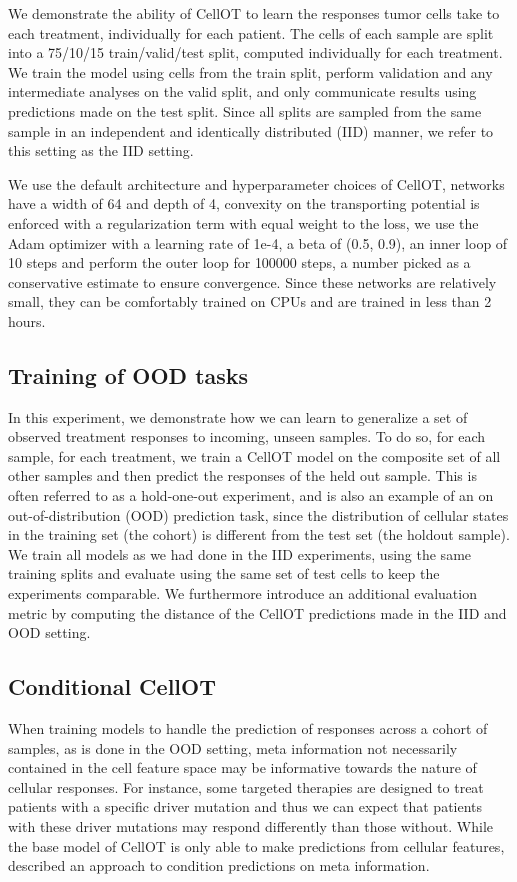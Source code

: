 We demonstrate the ability of CellOT to learn the responses tumor cells take to each treatment, individually for each patient. The cells of each sample are split into a 75/10/15 train/valid/test split, computed individually for each treatment. We train the model using cells from the train split, perform validation and any intermediate analyses on the valid split, and only communicate results using predictions made on the test split. Since all splits are sampled from the same sample in an independent and identically distributed (IID) manner, we refer to this setting as the IID setting.

We use the default architecture and hyperparameter choices of CellOT, networks have a width of 64 and depth of 4, convexity on the transporting potential is enforced with a regularization term with equal weight to the loss, we use the Adam optimizer \cite{kingma2014} with a learning rate of 1e-4, a beta of (0.5, 0.9), an inner loop of 10 steps and perform the outer loop for 100000 steps, a number picked as a conservative estimate to ensure convergence. Since these networks are relatively small, they can be comfortably trained on CPUs and are trained in less than 2 hours. 

\subsection{Training of OOD tasks}
In this experiment, we demonstrate how we can learn to generalize a set of observed treatment responses to incoming, unseen samples. To do so,  for each sample, for each treatment, we train a CellOT model on the composite set of all other samples and then predict the responses of the held out sample. This is often referred to as a hold-one-out experiment, and is also an example of an on out-of-distribution (OOD) prediction task, since the distribution of cellular states in the training set (the cohort) is different from the test set (the holdout sample). We train all models as we had done in the IID experiments, using the same training splits and evaluate using the same set of test cells to keep the experiments comparable.  We furthermore introduce an additional evaluation metric by computing the distance of the CellOT predictions made in the IID and OOD setting.

\subsection{Conditional CellOT}
When training models to handle the prediction of responses across a cohort of samples, as is done in the OOD setting, meta information not necessarily contained in the cell feature space may be informative towards the nature of cellular responses. For instance, some targeted therapies are designed to treat patients with a specific driver mutation and thus we can expect that patients with these driver mutations may respond differently than those without. While the base model of CellOT is only able to make predictions from cellular features, \cite{bunne2022} described an approach to condition predictions on meta information.

